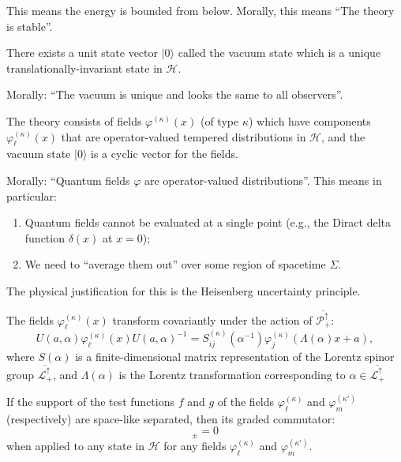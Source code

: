 \begin{remark}
This means the energy is bounded from below. Morally, this means ``The
theory is stable''.
\end{remark}

\begin{axiom}
There exists a unit state vector $|0\rangle$ called the vacuum state
which is a unique translationally-invariant state in $\mathcal{H}$.
\end{axiom}

Morally: ``The vacuum is unique and looks the same to all observers''.

\begin{axiom}
The theory consists of fields $\varphi^{(\kappa)}(x)$ (of type $\kappa$)
which have components $\varphi^{(\kappa)}_{\ell}(x)$ that are
operator-valued tempered distributions in $\mathcal{H}$, and the vacuum
state $|0\rangle$ is a cyclic vector for the fields.
\end{axiom}

Morally: ``Quantum fields $\varphi$ are operator-valued distributions''.
This means in particular:
\begin{enumerate}
\item Quantum fields cannot be evaluated at a single point (e.g., the
  Diract delta function $\delta(x)$ at $x=0$);
\item We need to ``average them out'' over some region of spacetime $\Sigma$.
\end{enumerate}
The physical justification for this is the Heisenberg uncertainty principle.

\begin{axiom}
The fields $\varphi^{(\kappa)}_{\ell}(x)$ transform covariantly under
the action of $\overline{\mathscr{P}^{\uparrow}_{+}}$:
\begin{equation}
U(a,\alpha)\varphi^{(\kappa)}_{\ell}(x)U(a,\alpha)^{-1} = S_{ij}^{(\kappa)}(\alpha^{-1})\varphi_{j}^{(\kappa)}(\Lambda(\alpha)x+a),
\end{equation}
where $S(\alpha)$ is a finite-dimensional matrix representation of the
Lorentz spinor group $\overline{\mathscr{L}^{\uparrow}_{+}}$, and
$\Lambda(\alpha)$ is the Lorentz transformation corresponding to
$\alpha\in\overline{\mathscr{L}^{\uparrow}_{+}}$
\end{axiom}

\begin{axiom}[Microcausality]
If the support of the test functions $f$ and $g$ of the fields
$\varphi^{(\kappa)}_{\ell}$ and $\varphi^{(\kappa')}_{m}$ (respectively)
are space-like separated, then its graded commutator:
\begin{equation}
[\varphi^{(\kappa)}_{\ell}(f), \varphi^{(\kappa')}_{m}(g)]_{\pm} = 0
\end{equation}
when applied to any state in $\mathcal{H}$ for any fields
$\varphi^{(\kappa)}_{\ell}$ and $\varphi^{(\kappa')}_{m}$.
\end{axiom}

